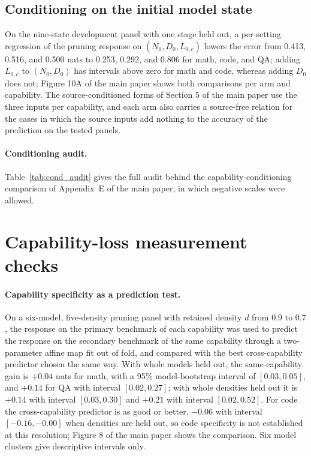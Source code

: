 \subsection{Conditioning on the initial model state}
\label{sec:app_conditioning}


On the nine-state development panel with one stage held out, a
per-setting regression of the pruning response on $(N_0,D_0,L_{0,c})$
lowers the error from 0.413, 0.516, and 0.500 nats to 0.253, 0.292,
and 0.806 for math, code, and QA; adding $L_{0,c}$ to $(N_0,D_0)$ has
intervals above zero for math and code, whereas adding $D_0$ does not; Figure 10A of the main paper shows both comparisons per arm and capability. The source-conditioned forms of Section 5 of the main paper use the three inputs per capability, and each
arm also carries a source-free relation for the cases in which the source inputs add nothing to the accuracy of the prediction on the tested panels.


\paragraph{Conditioning audit.} Table~\ref{tab:cond_audit} gives the full audit behind the capability-conditioning comparison of Appendix~E of the main paper, in which negative scales were allowed.

\FloatBarrier


\section{Capability-loss measurement checks}
\label{sec:supp_measure}

\paragraph{Capability specificity as a prediction test.} On a
six-model, five-density pruning panel with retained density $d$ from $0.9$ to $0.7$, the
response on the primary benchmark of each capability was used to
predict the response on the secondary benchmark of the same capability
through a two-parameter affine map fit out of fold, and compared with
the best cross-capability predictor chosen the same way. With whole
models held out, the same-capability gain is $+0.04$ nats for math, with a 95\% model-bootstrap interval of $[0.03,0.05]$, and $+0.14$ for QA with interval $[0.02,0.27]$; with whole densities held out it is $+0.14$ with interval $[0.03,0.30]$ and $+0.21$ with interval $[0.02,0.52]$. For code the cross-capability predictor is as good or better, $-0.06$ with interval $[-0.16,-0.00]$ when densities are held out, so code specificity is not established at this resolution; Figure 8 of the main paper shows the comparison. Six model clusters give descriptive
intervals only.



